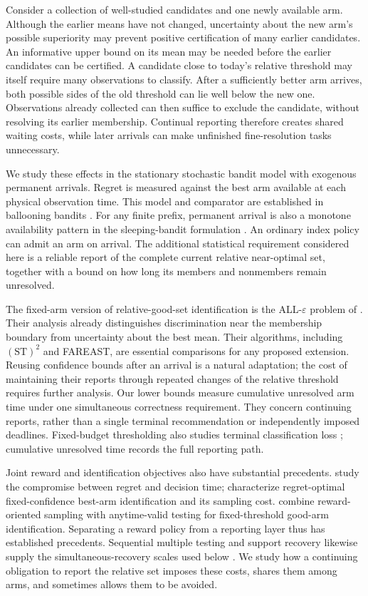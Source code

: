 \documentclass[11pt]{article}
\begin{document}
Consider a collection of well-studied candidates and one newly available arm.
Although the earlier means have not changed, uncertainty about the new arm's
possible superiority may prevent positive certification of many earlier
candidates. An informative upper bound on its mean may be needed before the
earlier candidates can be certified. A candidate close to today's relative
threshold may itself require many observations to classify. After a sufficiently
better arm arrives, both possible sides of
the old threshold can lie well below the new one. Observations already collected
can then suffice to exclude the candidate, without resolving its earlier
membership. Continual reporting therefore creates shared waiting costs, while
later arrivals can make unfinished fine-resolution tasks unnecessary.

We study these effects in the stationary stochastic bandit model with exogenous
permanent arrivals. Regret is measured against the best arm available at each
physical observation time. This model and comparator are established in
ballooning bandits \citep{ghalme2021}. For any finite prefix, permanent arrival
is also a monotone availability pattern in the sleeping-bandit formulation
\citep{kleinberg2010}. An ordinary index policy can admit an arm on arrival.
The additional statistical requirement considered here is a reliable report of
the complete current relative near-optimal set, together with a bound on how
long its members and nonmembers remain unresolved.

The fixed-arm version of relative-good-set identification is the
ALL-$\varepsilon$ problem of \citet{mason2020}. Their analysis already
distinguishes discrimination near the membership boundary from uncertainty
about the best mean. Their algorithms, including $(\mathrm{ST})^2$ and FAREAST,
are essential comparisons for any proposed extension. Reusing confidence bounds
after an arrival is a natural adaptation; the cost of maintaining their reports
through repeated changes of the relative threshold requires further analysis.
Our lower bounds measure cumulative unresolved arm time under one simultaneous
correctness requirement. They concern continuing reports, rather than a single
terminal recommendation or independently imposed deadlines.
Fixed-budget thresholding also studies terminal classification loss
\citep{cheshire2020}; cumulative unresolved time records the full reporting path.

Joint reward and identification objectives also have substantial precedents.
\citet{degenne2019} study the compromise between regret and decision time;
\citet{yang2026} characterize regret-optimal fixed-confidence best-arm
identification and its sampling cost. \citet{cho2025} combine reward-oriented
sampling with anytime-valid testing for fixed-threshold good-arm
identification. Separating a reward policy from a reporting layer thus has
established precedents. Sequential multiple testing
and support recovery likewise supply the simultaneous-recovery scales used
below \citep{malloy2014,jamieson2018}. We study how a continuing obligation to
report the relative set imposes these costs, shares them among arms, and
sometimes allows them to be avoided.
\end{document}

